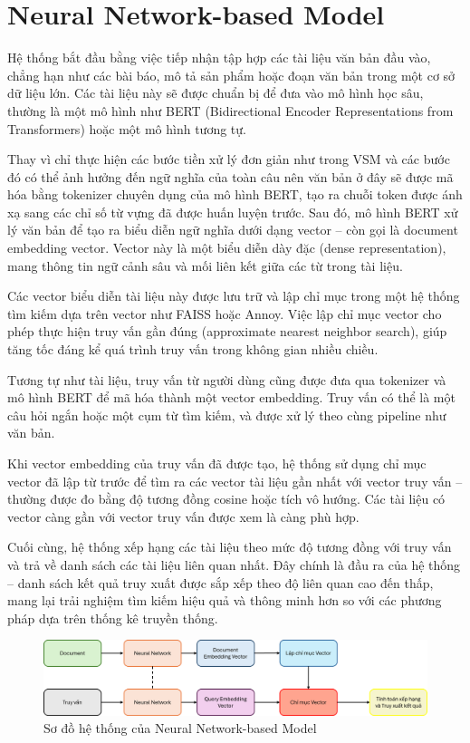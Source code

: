 \section{Neural Network-based Model}
Hệ thống bắt đầu bằng việc tiếp nhận tập hợp các tài liệu văn bản đầu vào, chẳng hạn như các bài báo, mô tả sản phẩm hoặc đoạn văn bản trong một cơ sở dữ liệu lớn. Các tài liệu này sẽ được chuẩn bị để đưa vào mô hình học sâu, thường là một mô hình như BERT (Bidirectional Encoder Representations from Transformers) hoặc một mô hình tương tự.

Thay vì chỉ thực hiện các bước tiền xử lý đơn giản như trong VSM và các bước đó có thể ảnh hưởng đến ngữ nghĩa của toàn câu nên văn bản ở đây sẽ được mã hóa bằng tokenizer chuyên dụng của mô hình BERT, tạo ra chuỗi token được ánh xạ sang các chỉ số từ vựng đã được huấn luyện trước. Sau đó, mô hình BERT xử lý văn bản để tạo ra biểu diễn ngữ nghĩa dưới dạng vector -- còn gọi là document embedding vector. Vector này là một biểu diễn dày đặc (dense representation), mang thông tin ngữ cảnh sâu và mối liên kết giữa các từ trong tài liệu.

Các vector biểu diễn tài liệu này được lưu trữ và lập chỉ mục trong một hệ thống tìm kiếm dựa trên vector như FAISS hoặc Annoy. Việc lập chỉ mục vector cho phép thực hiện truy vấn gần đúng (approximate nearest neighbor search), giúp tăng tốc đáng kể quá trình truy vấn trong không gian nhiều chiều.

Tương tự như tài liệu, truy vấn từ người dùng cũng được đưa qua tokenizer và mô hình BERT để mã hóa thành một vector embedding. Truy vấn có thể là một câu hỏi ngắn hoặc một cụm từ tìm kiếm, và được xử lý theo cùng pipeline như văn bản.

Khi vector embedding của truy vấn đã được tạo, hệ thống sử dụng chỉ mục vector đã lập từ trước để tìm ra các vector tài liệu gần nhất với vector truy vấn -- thường được đo bằng độ tương đồng cosine hoặc tích vô hướng. Các tài liệu có vector càng gần với vector truy vấn được xem là càng phù hợp.

Cuối cùng, hệ thống xếp hạng các tài liệu theo mức độ tương đồng với truy vấn và trả về danh sách các tài liệu liên quan nhất. Đây chính là đầu ra của hệ thống -- danh sách kết quả truy xuất được sắp xếp theo độ liên quan cao đến thấp, mang lại trải nghiệm tìm kiếm hiệu quả và thông minh hơn so với các phương pháp dựa trên thống kê truyền thống.

\begin{figure}[H]
    \caption{Sơ đồ hệ thống của Neural Network-based Model}
    \begin{center}
        \includegraphics[width=\linewidth]{assets/nn-based-flowchart.png}
    \end{center}
\end{figure}

